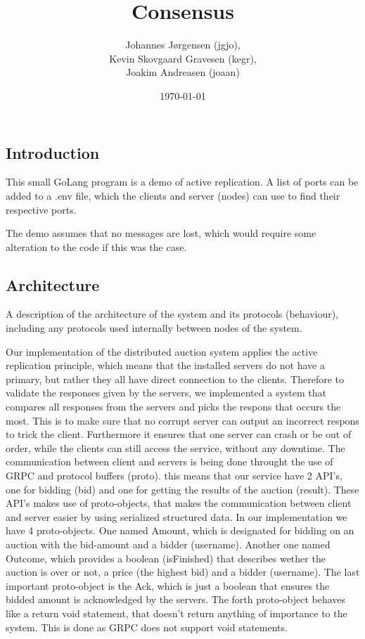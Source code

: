 \documentclass[a4paper,11pt]{article}
\title{Consensus}
\author{Johannes Jørgensen (jgjo),\\ Kevin Skovgaard Gravesen (kegr),\\ Joakim Andreasen (joaan)}
\date{\today}
\begin{document}
 

\maketitle

\subsection{Introduction}
This small GoLang program is a demo of active replication. A list of ports can be added to a .env file,
which the clients and server (nodes) can use to find their respective ports.

The demo assumes that no messages are lost, which would require some alteration to the code if this was the case.

\subsection{Architecture}
A description of the architecture of the system and its protocols (behaviour), including any protocols used internally between nodes of the system. 

Our implementation of the distributed auction system applies the active replication principle, which means that the installed servers do not have a primary, but rather they all have direct connection to the clients. 
Therefore to validate the responses given by the servers, we implemented a system that compares all responses from the servers and picks the respons that occurs the most. This is to make sure that no corrupt server can output an incorrect respons to trick the client.
Furthermore it ensures that one server can crash or be out of order, while the clients can still access the service, without any downtime. The communication between client and servers is being done throught the use of GRPC and protocol buffers (proto). 
this means that our service have 2 API's, one for bidding (bid) and one for getting the results of the auction (result). These API's makes use of proto-objects, that makes the communication between client and server easier by using serialized structured data.
In our implementation we have 4 proto-objects. One named Amount, which is designated for bidding on an auction with the bid-amount and a bidder (username). Another one named Outcome, which provides a boolean (isFinished) that describes wether the auction is over or not, a price (the highest bid) and a bidder (username). The last important proto-object is the Ack, which is just a boolean that ensures the bidded amount is acknowledged by the servers. The forth proto-object behaves like a return void statement, that doesn't return anything of importance to the system. This is done as GRPC does not support void statements.
\end{document}
